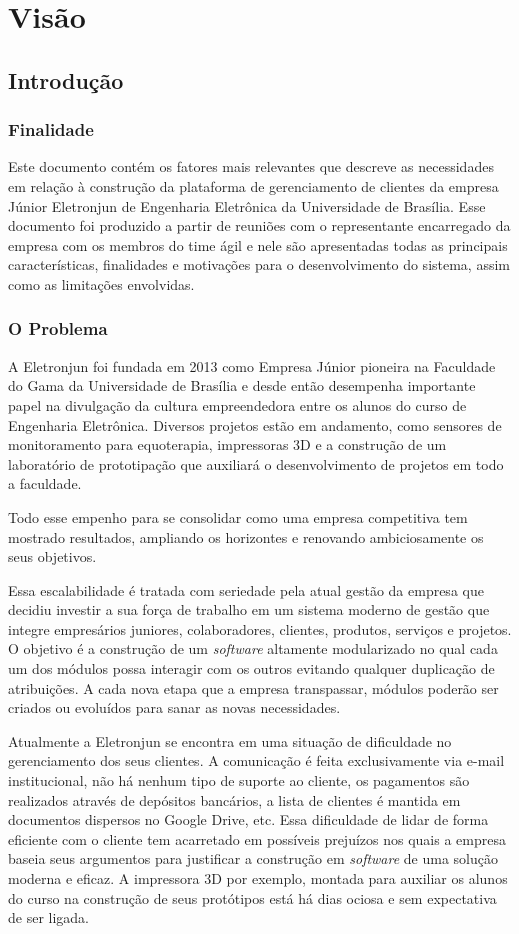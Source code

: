 \chapter{Visão}
  \section{Introdução}
    \subsection{Finalidade}
Este documento contém os fatores mais relevantes que descreve as necessidades em relação à construção da plataforma de gerenciamento de clientes da empresa Júnior Eletronjun de Engenharia Eletrônica da Universidade de Brasília. Esse documento foi produzido a partir de reuniões com o representante encarregado da empresa com os membros do time ágil e nele são apresentadas todas as principais características, finalidades e motivações para o desenvolvimento do sistema, assim como as limitações envolvidas. 

    \subsection{O Problema}
A Eletronjun foi fundada em 2013 como Empresa Júnior pioneira na Faculdade do Gama da Universidade de Brasília e desde então desempenha importante papel na divulgação da cultura empreendedora entre os alunos do curso de Engenharia Eletrônica. Diversos projetos estão em andamento, como sensores de monitoramento para equoterapia, impressoras 3D e a construção de um laboratório de prototipação que auxiliará o desenvolvimento de projetos em todo a faculdade.

Todo esse empenho para se consolidar como uma empresa competitiva tem mostrado resultados, ampliando os horizontes e renovando ambiciosamente os seus objetivos.

Essa escalabilidade é tratada com seriedade pela atual gestão da empresa que decidiu investir a sua força de trabalho em um sistema moderno de gestão que integre empresários juniores, colaboradores, clientes, produtos, serviços e projetos. O objetivo é a construção de um \textit{software} altamente modularizado no qual cada um dos módulos possa interagir com os outros evitando qualquer duplicação de atribuições. A cada nova etapa que a empresa transpassar, módulos poderão ser criados ou evoluídos para sanar as novas necessidades.

Atualmente a Eletronjun se encontra em uma situação de dificuldade no gerenciamento dos seus clientes. A comunicação é feita exclusivamente via e-mail institucional, não há nenhum tipo de suporte ao cliente, os pagamentos são realizados através de depósitos bancários, a lista de clientes é mantida em documentos dispersos no Google Drive, etc. Essa dificuldade de lidar de forma eficiente com o cliente tem acarretado em possíveis prejuízos nos quais a empresa baseia seus argumentos para justificar a construção em \textit{software} de uma solução moderna e eficaz. A impressora 3D por exemplo, montada para auxiliar os alunos do curso na construção de seus protótipos está há dias ociosa e sem expectativa de ser ligada.

